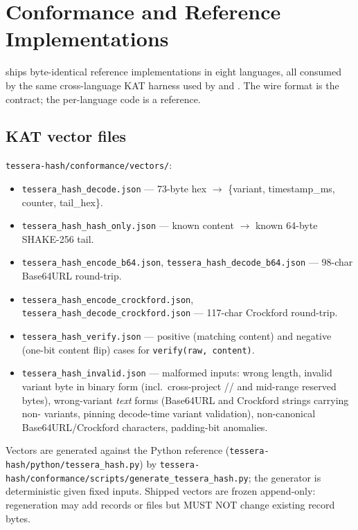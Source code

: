 \section{Conformance and Reference Implementations}
\label{sec:conformance}

\tesserahash{} ships byte-identical reference implementations in eight languages, all consumed by the same cross-language KAT harness used by \tesseraid{} and \tesseraseal{}. The wire format is the contract; the per-language code is a reference.

\subsection{KAT vector files}

\texttt{tessera-hash/conformance/vectors/}:

\begin{itemize}
\item \texttt{tessera\_hash\_decode.json} --- 73-byte hex $\to$ \{variant, timestamp\_ms, counter, tail\_hex\}.
\item \texttt{tessera\_hash\_hash\_only.json} --- known content $\to$ known 64-byte SHAKE-256 tail.
\item \texttt{tessera\_hash\_encode\_b64.json}, \texttt{tessera\_hash\_decode\_b64.json} --- 98-char Base64URL round-trip.
\item \texttt{tessera\_hash\_encode\_crockford.json}, \texttt{tessera\_hash\_decode\_crockford.json} --- 117-char Crockford round-trip.
\item \texttt{tessera\_hash\_verify.json} --- positive (matching content) and negative (one-bit content flip) cases for \texttt{verify(raw, content)}.
\item \texttt{tessera\_hash\_invalid.json} --- malformed inputs: wrong length, invalid variant byte in binary form (incl.\ cross-project // and mid-range reserved bytes), wrong-variant \emph{text} forms (Base64URL and Crockford strings carrying non- variants, pinning decode-time variant validation), non-canonical Base64URL/Crockford characters, padding-bit anomalies.
\end{itemize}

Vectors are generated against the Python reference (\texttt{tessera-hash/python/tessera\_hash.py}) by \texttt{tessera-hash/conformance/scripts/generate\_tessera\_hash.py}; the generator is deterministic given fixed inputs. Shipped vectors are frozen append-only: regeneration may add records or files but MUST NOT change existing record bytes.

